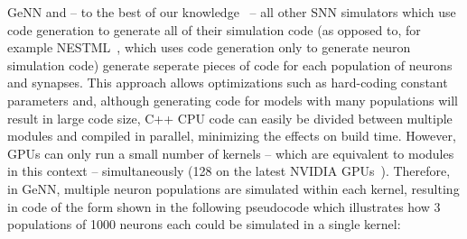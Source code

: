 \documentclass[9pt,twocolumn,twoside,lineno]{pnas-new}
\begin{document}
GeNN and -- to the best of our knowledge~\citep{Blundell2018} -- all other SNN simulators which use code generation to generate all of their simulation code (as opposed to, for example NESTML~\citep{Plotnikov2016}, which uses code generation only to generate neuron simulation code) generate seperate pieces of code for each population of neurons and synapses.
This approach allows optimizations such as hard-coding constant parameters and, although generating code for models with many populations will result in large code size, C++ CPU code can easily be divided between multiple modules and compiled in parallel, minimizing the effects on build time.
However, GPUs can only run a small number of kernels -- which are equivalent to modules in this context --  simultaneously (128 on the latest NVIDIA GPUs~\citep[p278]{NVIDIACorporation2019}).
Therefore, in GeNN, multiple neuron populations are simulated within each kernel, resulting in code of the form shown in the following pseudocode which illustrates how 3 populations of 1000 neurons each could be simulated in a single kernel:
\end{document}
